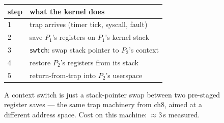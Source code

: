 \begin{figure}[htbp]
\centering
\begin{tabular}{ll}
\toprule
step & what the kernel does \\
\midrule
1 & trap arrives (timer tick, syscall, fault) \\
2 & save $P_1$'s registers on $P_1$'s kernel stack \\
3 & \texttt{swtch}: swap stack pointer to $P_2$'s context \\
4 & restore $P_2$'s registers from its stack \\
5 & return-from-trap into $P_2$'s userspace \\
\bottomrule
\end{tabular}
\caption{A context switch is just a stack-pointer swap between two
pre-staged register saves --- the same trap machinery from ch8,
aimed at a different address space. Cost on this machine:
$\approx$3\,\textmu s measured.}
\label{fig:ctxsw12}
\end{figure}
